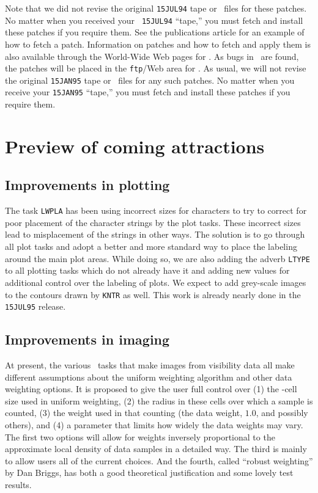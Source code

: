 \vspace{-8pt}
Note that we did not revise the original {\tt 15JUL94} tape or \tar\
files for these patches.  No matter when you received your {\tt
15JUL94} ``tape,'' you must fetch and install these patches if you
require them.  See the publications article for an example of how to
fetch a patch.  Information on patches and how to fetch and apply them
is also available through the World-Wide Web pages for \hbox{\AIPS}.
As bugs in \RELEASENAME\ are found, the patches will be placed in the
{\tt ftp}/Web area for \hbox{{\RELEASENAME}}.  As usual, we will not
revise the original {\tt 15JAN95} tape or \tar\ files for any such
patches.  No matter when you receive your {\tt 15JAN95} ``tape,'' you
must fetch and install these patches if you require them.

\eject

\section{Preview of coming attractions}

\subsection{Improvements in plotting}

The task {\tt LWPLA} has been using incorrect sizes for characters to
try to correct for poor placement of the character strings by the plot
tasks.  These incorrect sizes lead to misplacement of the strings in
other ways.  The solution is to go through all plot tasks and adopt a
better and more standard way to place the labeling around the main
plot areas.  While doing so, we are also adding the adverb {\tt LTYPE}
to all plotting tasks which do not already have it and adding new
values for additional control over the labeling of plots.  We expect
to add grey-scale images to the contours drawn by {\tt KNTR} as well.
This work is already nearly done in the {\tt 15JUL95} release.

\subsection{Improvements in imaging}

At present, the various \AIPS\ tasks that make images from visibility
data all make different assumptions about the uniform weighting
algorithm and other data weighting options.  It is proposed to give
the user full control over (1) the \uv-cell size used in uniform
weighting, (2) the radius in these cells over which a sample is
counted, (3) the weight used in that counting (the data weight, $1.0$,
and possibly others), and (4) a parameter that limits how widely the
data weights may vary.  The first two options will allow for weights
inversely proportional to the approximate local density of data
samples in a detailed way.  The third is mainly to allow users all of
the current choices.  And the fourth, called ``robust weighting'' by
Dan Briggs, has both a good theoretical justification and some lovely
test results.

